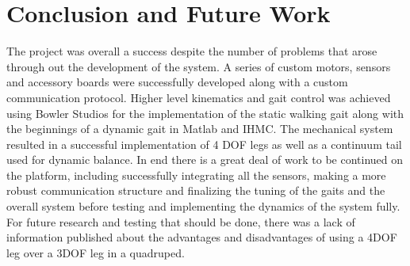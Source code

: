 \section{Conclusion and Future Work}

The project was overall a success despite the number of problems that arose through out the development of the system. A series of custom motors, sensors and accessory boards were successfully developed along with a custom communication protocol. Higher level kinematics and gait control was achieved using Bowler Studios for the implementation of the static walking gait along with the beginnings of a dynamic gait in Matlab and IHMC. The mechanical system resulted in a successful implementation of 4 DOF legs as well as a continuum tail used for dynamic balance. In end there is a great deal of work to be continued on the platform, including successfully integrating all the sensors, making a more robust communication structure and finalizing the tuning of the gaits and the overall system before testing and implementing the dynamics of the system fully. For future research and testing that should be done, there was a lack of information published about the advantages and disadvantages of using a 4DOF leg over a 3DOF leg in a quadruped.
